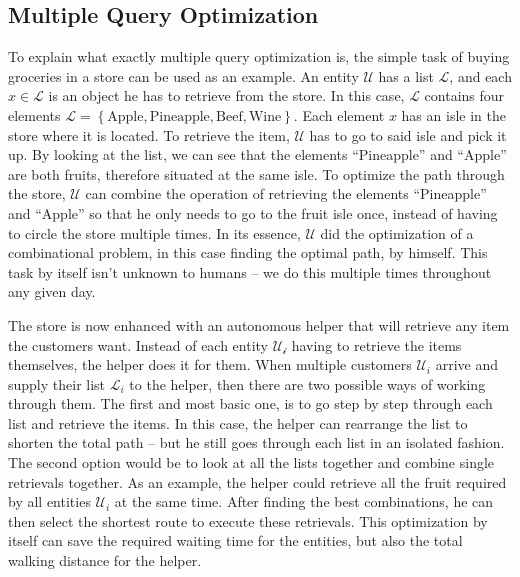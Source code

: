 \subsection{Multiple Query Optimization}
To explain what exactly multiple query optimization is, the simple task of buying groceries in a store can be used as an example. An entity $\mathcal{U}$ has a list $\mathcal{L}$, and each $x \in \mathcal{L}$ is an object he has to retrieve from the store. In this case, $\mathcal{L}$ contains four elements $\mathcal{L} = \left\{ \text{Apple}, \text{Pineapple}, \text{Beef}, \text{Wine}\right\}$. Each element $x$ has an isle in the store where it is located. To retrieve the item, $\mathcal{U}$ has to go to said isle and pick it up. By looking at the list, we can see that the elements “Pineapple” and “Apple” are both fruits, therefore situated at the same isle. To optimize the path through the store, $\mathcal{U}$ can combine the operation of retrieving the elements “Pineapple” and “Apple” so that he only needs to go to the fruit isle once, instead of having to circle the store multiple times. In its essence, $\mathcal{U}$ did the optimization of a combinational problem, in this case finding the optimal path, by himself. This task by itself isn't unknown to humans – we do this multiple times throughout any given day. \par
The store is now enhanced with an autonomous helper that will retrieve any item the customers want. Instead of each entity $\mathcal{U_i}$ having to retrieve the items themselves, the helper does it for them. When multiple customers $\mathcal{U}_i$ arrive and supply their list $\mathcal{L}_i$ to the helper, then there are two possible ways of working through them. The first and most basic one, is to go step by step through each list and retrieve the items. In this case, the helper can rearrange the list to shorten the total path – but he still goes through each list in an isolated fashion. The second option would be to look at all the lists together and combine single retrievals together. As an example, the helper could retrieve all the fruit required by all entities $\mathcal{U}_i$ at the same time. After finding the best combinations, he can then select the shortest route to execute these retrievals. This optimization by itself can save the required waiting time for the entities, but also the total walking distance for the helper.\par
